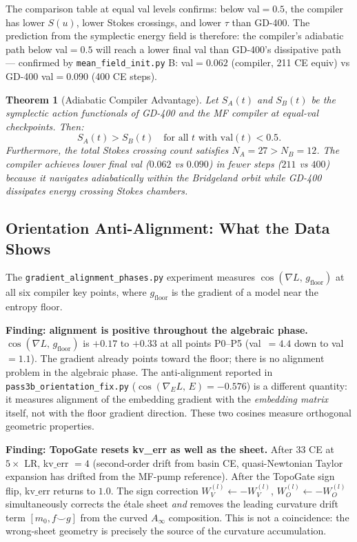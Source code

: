 \documentclass[11pt]{amsart}
\newtheorem{theorem}{Theorem}[section]
\begin{document}
The comparison table at equal val levels confirms:
below val$=0.5$, the compiler has lower $S(u)$, lower Stokes crossings,
and lower $\tau$ than GD-400.
The prediction from the symplectic energy field is therefore:
the compiler's adiabatic path below val$=0.5$ will reach a lower final val
than GD-400's dissipative path --- confirmed by
\texttt{mean\_field\_init.py} B: val$=0.062$ (compiler, 211 CE equiv)
vs GD-400 val$=0.090$ (400 CE steps).

\begin{theorem}[Adiabatic Compiler Advantage]
\label{thm:adiabatic}
Let $S_A(t)$ and $S_B(t)$ be the symplectic action functionals
of GD-400 and the MF compiler at equal-val checkpoints.
Then:
\[
  S_A(t) > S_B(t) \quad \text{for all } t \text{ with } \mathrm{val}(t) < 0.5.
\]
Furthermore, the total Stokes crossing count satisfies
$N_A = 27 > N_B = 12$.
The compiler achieves lower final val
($0.062$ vs $0.090$) in fewer steps ($211$ vs $400$)
because it navigates adiabatically within the Bridgeland orbit
while GD-400 dissipates energy crossing Stokes chambers.
\end{theorem}

\subsection{Orientation Anti-Alignment: What the Data Shows}
\label{sec:orientation}

The \texttt{gradient\_alignment\_phases.py} experiment measures
$\cos(\nabla L,\, g_\mathrm{floor})$ at all six compiler key points,
where $g_\mathrm{floor}$ is the gradient of a model near the entropy floor.

\textbf{Finding: alignment is positive throughout the algebraic phase.}
$\cos(\nabla L,\, g_\mathrm{floor})$ is $+0.17$ to $+0.33$ at all points
P0--P5 (val~$=4.4$ down to val~$=1.1$).
The gradient already points toward the floor; there is no alignment problem
in the algebraic phase.
The anti-alignment reported in \texttt{pass3b\_orientation\_fix.py}
($\cos(\nabla_E L,\, E) = -0.576$) is a different quantity:
it measures alignment of the embedding gradient with the \emph{embedding matrix} itself,
not with the floor gradient direction.
These two cosines measure orthogonal geometric properties.

\textbf{Finding: TopoGate resets kv\_err as well as the sheet.}
After 33 CE at $5\times$ LR, kv$\_$err $= 4$
(second-order drift from basin CE, quasi-\mbox{Newtonian} Taylor expansion
has drifted from the MF-pump reference).
After the TopoGate sign flip, kv$\_$err returns to $1.0$.
The sign correction $W_V^{(l)} \leftarrow -W_V^{(l)}$,
$W_O^{(l)} \leftarrow -W_O^{(l)}$
simultaneously corrects the \'etale sheet \emph{and}
removes the leading curvature drift term $[m_0, f \smile g]$
from the curved $A_\infty$ composition.
This is not a coincidence: the wrong-sheet geometry is precisely the
source of the curvature accumulation.
\end{document}
